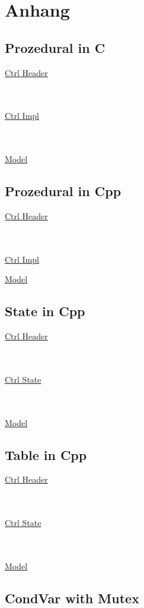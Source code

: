 \newpage
\onecolumn
\section{Anhang}
\subsection{Prozedural in C}
\underline{Ctrl Header}

~\\~\\
\underline{Ctrl Impl}

~\\~\\
\underline{Model}


\subsection{Prozedural in Cpp}
\underline{Ctrl Header}

~\\~\\
\underline{Ctrl Impl}


\underline{Model}


\subsection{State in Cpp}
\underline{Ctrl Header}

~\\~\\
\underline{Ctrl State}

~\\~\\
\underline{Model}


\subsection{Table in Cpp}
\underline{Ctrl Header}

~\\~\\
\underline{Ctrl State}

~\\~\\
\underline{Model}


\subsection{CondVar with Mutex}

